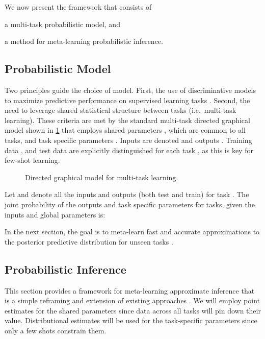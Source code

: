 \documentclass{article}
\begin{document}
We now present the framework that consists of
\begin{inlinelist}
\item a multi-task probabilistic model, and
\item a method for meta-learning probabilistic inference.
\end{inlinelist}

\subsection{Probabilistic Model} 
\label{sec:model}
Two principles guide the choice of model. First, the use of discriminative models to maximize predictive performance on supervised learning tasks \citep{ng2002discriminative}. Second, the need to leverage shared statistical structure between tasks (i.e.~multi-task learning). These criteria are met by the standard multi-task directed graphical model shown in \cref{fig:model_graph} that employs shared parameters , which are common to all tasks, and task specific parameters . Inputs are denoted  and outputs . Training data  , and  test data  are explicitly distinguished for each task , as this is key for few-shot learning. 
\begin{figure}[h]
	\centering
	
	\caption[short]{Directed graphical model for multi-task learning.}
	\label{fig:model_graph}
\end{figure}


Let  and  denote all the inputs and outputs (both test and train) for task . The joint probability of the outputs and task specific parameters for  tasks, given the inputs and global parameters is:



In the next section, the goal is to meta-learn fast and accurate approximations to the posterior predictive distribution  for unseen tasks .



\subsection{Probabilistic Inference}

This section provides a framework for meta-learning approximate inference that is a simple reframing and extension of existing approaches \citep{finn2017model, grant2018recasting}. We will employ point estimates for the shared parameters  since data across all tasks will pin down their value. Distributional estimates will be used for the task-specific parameters since only a few shots constrain them.
\end{document}
